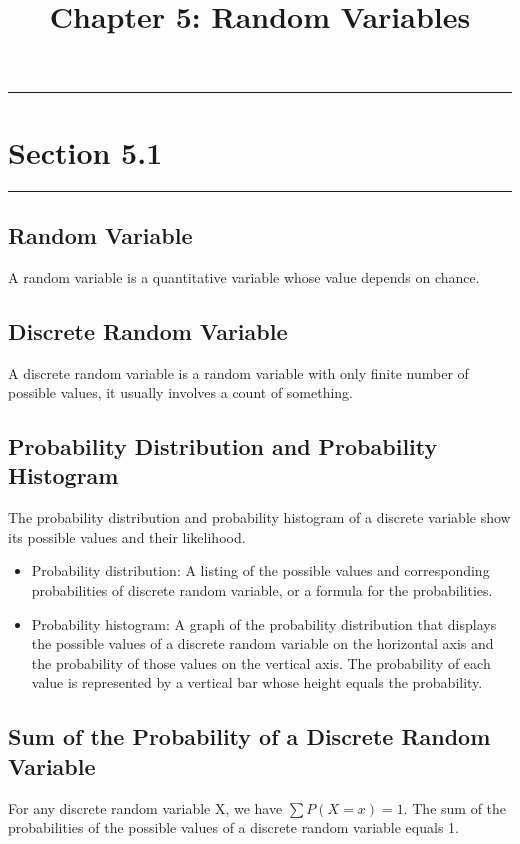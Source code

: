 \documentclass[12pt]{article}
\title{Chapter 5: Random Variables}
\author{}
\begin{document}
    \maketitle

    \noindent\rule{\textwidth}{0.4pt}
    \section*{Section 5.1}
    \noindent\rule{\textwidth}{0.4pt}
        \subsection*{Random Variable}
            A random variable is a quantitative variable whose value depends on chance.
        \subsection*{Discrete Random Variable}
            A discrete random variable is a random variable with only finite number of possible values, it
            usually involves a count of something.
        \subsection*{Probability Distribution and Probability Histogram}
            The probability distribution and probability histogram of a discrete variable show its 
            possible values and their likelihood.
            \begin{itemize}
                \item {Probability distribution:} A listing of the possible values and corresponding
                probabilities of discrete random variable, or a formula for the probabilities.
                \item {Probability histogram:} A graph of the probability distribution that displays the 
                possible values of a discrete random variable on the horizontal axis and the probability of
                those values on the vertical axis. The probability of each value is represented by a vertical
                bar whose height equals the probability.
            \end{itemize}
        \subsection*{Sum of the Probability of a Discrete Random Variable}
            For any discrete random variable X, we have $\sum P(X=x)=1$. The sum of the probabilities of
            the possible values of a discrete random variable equals 1.
\end{document}

